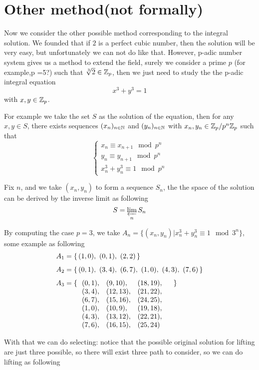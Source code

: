 \section{Other method(not formally)}
Now we consider the other possible method corresponding to the integral solution. We founded that if \(2\) is a perfect cubic number, then the solution will be very easy, but unfortunately we can not do like that. However, p-adic number system gives us a method to extend the field, surely we consider a prime \(p\) (for example,p =5?) such that \(\sqrt[3]{2} \in \mathbb{Z}_p\), then we just need to study the the p-adic integral equation
\[x^3+y^3=1\]
with \(x,y \in \mathbb{Z}_p\).

For example we take the set \(S\) as the solution of the equation,
then for any \(x,y \in S\), there exists sequences \((x_n)_{n \in \mathbb{N}}\) and \((y_n)_{n \in \mathbb{N}}\) with
\(x_n, y_n \in \mathbb{Z}_p/p^n\mathbb{Z}_p\) such that
\[\begin{cases}
    x_n \equiv x_{n+1} \mod {p^n} \\
    y_n \equiv y_{n+1} \mod {p^n} \\
    x_n^3+y_n^3 \equiv 1 \mod {p^n}
\end{cases}\]

Fix \(n\), and we take \((x_n,y_n)\) to form a sequence \(S_n\), the the space of the solution can be derived by the inverse limit as following
\[S = \varprojlim_{n} S_n\]

By computing the case \(p=3\), we take \(A_n = \{(x_n,y_n)| x^3_n+y^3_n \equiv 1 \mod 3^n \}\), some example as following
\begin{align*}
    A_1 &= \{\, (1,0),\ (0,1),\ (2,2) \,\} \\[1ex]
    A_2 &= \{\, 
        (0,1),\ (3,4),\ (6,7),\ 
        (1,0),\ (4,3),\ (7,6)
    \,\} \\[1ex]
    A_3 &= \{\, 
    \begin{array}[t]{llll}
        (0,1), & (9,10), & (18,19), & \\
        (3,4), & (12,13), & (21,22), & \\
        (6,7), & (15,16), & (24,25), & \\
        (1,0), & (10,9), & (19,18), & \\
        (4,3), & (13,12), & (22,21), & \\
        (7,6), & (16,15), & (25,24) &
    \end{array}
    \,\}
    \end{align*}

    With that we can do selecting: notice that the possible original solution for lifting are just three possible, so there will exist three path to consider, so we can do lifting as following

